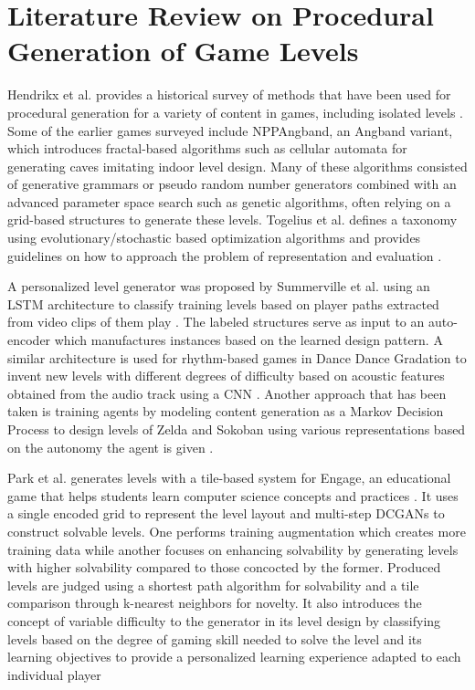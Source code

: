 \documentclass{Configuration_Files/PoliMi3i_thesis}
\begin{document}
\section{Literature Review on Procedural Generation of Game Levels}
Hendrikx et al. provides a historical survey of methods that have been used for 
procedural generation for a variety of content in games, including isolated levels 
\cite{MaH13}. Some of the earlier games surveyed include NPPAngband, an Angband 
variant, which introduces fractal-based algorithms such as cellular automata for generating 
caves imitating indoor level design. Many of these algorithms consisted of generative 
grammars or pseudo random number generators combined with an advanced 
parameter space search such as genetic algorithms, often relying on a grid-based 
structures to generate these levels. Togelius et al. defines a taxonomy using 
evolutionary/stochastic based optimization algorithms and provides guidelines on 
how to approach the problem of representation and evaluation \cite{JuT11}.

A personalized level generator was proposed by Summerville et al. using an LSTM 
architecture to classify training levels based on player paths extracted from video clips
 of them play \cite{AdS21}. The labeled structures serve as input 
to an auto-encoder which manufactures instances based on the learned design 
pattern. A similar architecture is used for rhythm-based games in Dance Dance 
Gradation to invent new levels with different degrees of difficulty based on acoustic 
features obtained from the audio track using a CNN \cite{YuT18}. Another approach that has 
been taken is training agents by modeling content generation as a Markov 
Decision Process to design levels of Zelda and Sokoban using various representations 
based on the autonomy the agent is given \cite{AhK20}.

Park et al. generates levels with a tile-based system for Engage, an educational game 
that helps students learn computer science concepts and practices \cite{KyP19}. It uses a single 
encoded grid to represent the level layout and multi-step DCGANs to construct
solvable levels. One performs training augmentation which creates more training 
data while another focuses on enhancing solvability by generating levels with higher 
solvability compared to those concocted by the former. Produced levels are judged 
using a shortest path algorithm for solvability and a tile comparison through k-nearest 
neighbors for novelty. It also introduces the concept of variable difficulty to 
the generator in its level design by classifying levels based on the degree of gaming 
skill needed to solve the level and its learning objectives to provide a personalized 
learning experience adapted to each individual player
\newpage
\end{document}
